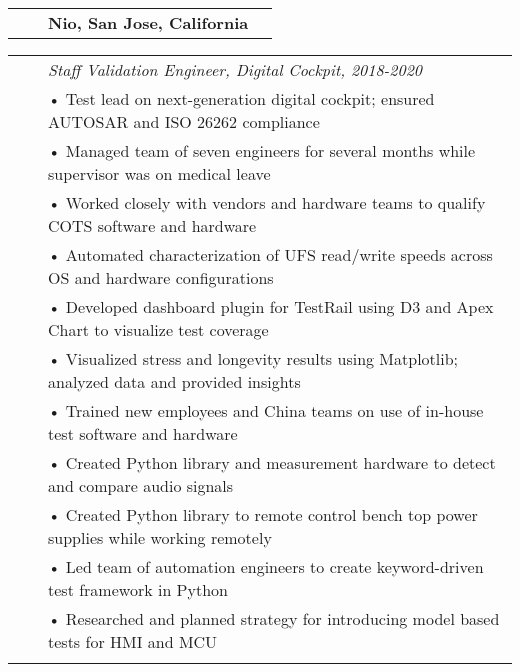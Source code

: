 \documentclass{minimal}
\begin{document}
\begin{tabular}{ p{1.5cm} p{1cm} p{16cm} >{\raggedleft\arraybackslash}p{3cm} }
& & \textbf{Nio, San Jose, California} & \\
\end{tabular}

\begin{tabular}{ p{1.5cm} p{1cm} p{16cm} }
& & \textit{Staff Validation Engineer, Digital Cockpit, 2018-2020}\\
& & • Test lead on next-generation digital cockpit; ensured AUTOSAR and ISO 26262 compliance\\
& & • Managed team of seven engineers for several months while supervisor was on medical leave\\
& & • Worked closely with vendors and hardware teams to qualify COTS software and hardware\\
& & • Automated characterization of UFS read/write speeds across OS and hardware configurations\\
& & • Developed dashboard plugin for TestRail using D3 and Apex Chart to visualize test coverage\\
& & • Visualized stress and longevity results using Matplotlib; analyzed data and provided insights\\
& & • Trained new employees and China teams on use of in-house test software and hardware\\
& & • Created Python library and measurement hardware to detect and compare audio signals\\
& & • Created Python library to remote control bench top power supplies while working remotely\\
& & • Led team of automation engineers to create keyword-driven test framework in Python\\
& & • Researched and planned strategy for introducing model based tests for HMI and MCU\\
& & \\
\end{tabular}
\end{document}

